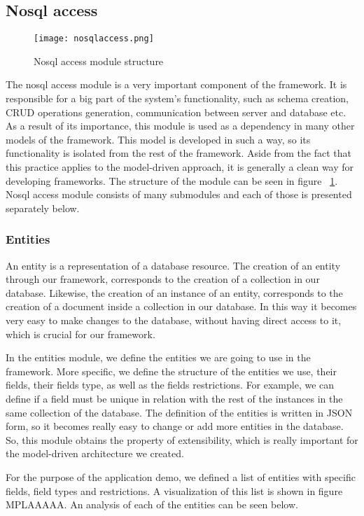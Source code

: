 \subsection{Nosql access}
\label{nosql}
\begin{figure}
	\texttt{[image: nosqlaccess.png]}
	\caption{Nosql access module structure}
	\label{nosqlaccess}
\end{figure}
The nosql access module is a very important component of the framework. It is responsible for a big part of the system's functionality, such as schema creation, CRUD operations generation, communication between server and database etc. As a result of its importance, this module is used as a dependency in many other models of the framework. This model is developed in such a way, so its functionality is isolated from the rest of the framework. Aside from the fact that this practice applies to the model-driven approach, it is generally a clean way for developing frameworks. The structure of the module can be seen in figure ~\ref{nosqlaccess}. Nosql access module consists of many submodules and each of those is presented separately below. 

\subsubsection{Entities}
\label{entities}
An entity is a representation of a database resource. The creation of an entity through our framework, corresponds to the creation of a collection in our database. Likewise, the creation of an instance of an entity, corresponds to the creation of a document inside a collection in our database. In this way it becomes very easy to make changes to the database, without having direct access to it, which is crucial for our framework.\par
	In the entities module, we define the entities we are going to use in the framework. More specific, we define the structure of the entities we use, their fields, their fields type, as well as the fields restrictions. For example, we can define if a field must be unique in relation with the rest of the instances in the same collection of the database. The definition of the entities is written in JSON form, so it becomes really easy to change or add more entities in the database. So, this module obtains the property of extensibility, which is really important for the model-driven architecture we created. \par 
	For the purpose of the application demo, we defined a list of entities with specific fields, field types and restrictions. A visualization of this list is shown in figure MPLAAAAA. An analysis of each of the entities can be seen below.\par
	
